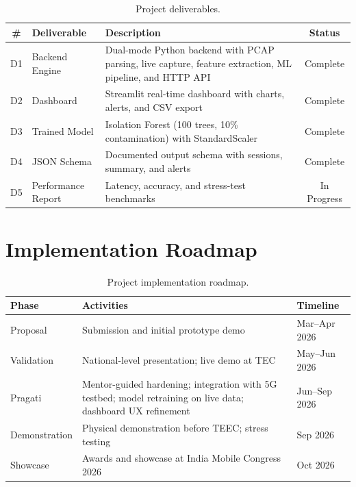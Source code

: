 \documentclass[11pt, a4paper]{article}
\begin{document}
\begin{table}[H]
\centering
\begin{tabular}{c l p{7cm} c}
\toprule
\textbf{\#} & \textbf{Deliverable} & \textbf{Description} & \textbf{Status} \\
\midrule
D1 & Backend Engine & Dual-mode Python backend with PCAP parsing, live capture, feature extraction, ML pipeline, and HTTP API & Complete \\
D2 & Dashboard & Streamlit real-time dashboard with charts, alerts, and CSV export & Complete \\
D3 & Trained Model & Isolation Forest (100 trees, 10\% contamination) with StandardScaler & Complete \\
D4 & JSON Schema & Documented output schema with sessions, summary, and alerts & Complete \\
D5 & Performance Report & Latency, accuracy, and stress-test benchmarks & In Progress \\
\bottomrule
\end{tabular}
\caption{Project deliverables.}
\label{tab:deliverables}
\end{table}

\section{Implementation Roadmap}

\begin{table}[H]
\centering
\begin{tabular}{l p{8cm} l}
\toprule
\textbf{Phase} & \textbf{Activities} & \textbf{Timeline} \\
\midrule
Proposal       & Submission and initial prototype demo & Mar--Apr 2026 \\
Validation     & National-level presentation; live demo at TEC & May--Jun 2026 \\
Pragati        & Mentor-guided hardening; integration with 5G testbed; model retraining on live data; dashboard UX refinement & Jun--Sep 2026 \\
Demonstration  & Physical demonstration before TEEC; stress testing & Sep 2026 \\
Showcase       & Awards and showcase at India Mobile Congress 2026 & Oct 2026 \\
\bottomrule
\end{tabular}
\caption{Project implementation roadmap.}
\label{tab:roadmap}
\end{table}
\end{document}
